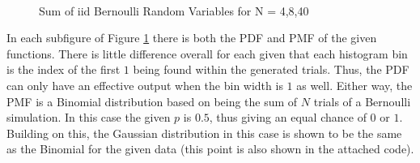 \documentclass[a4paper, 11pt]{article}
\begin{document}
\pagebreak
\begin{figure}
    \centering
     \\
\caption{\label{fig:BernSubFig}Sum of iid Bernoulli Random Variables for N = 4,8,40}
\end{figure}


\medskip
\noindent
In each subfigure of Figure \ref{fig:BernSubFig} there is both the PDF and PMF of the given functions. There is little difference overall for each given that each histogram bin is the index of the first \(1\) being found within the generated trials. Thus, the PDF can only have an effective output when the bin width is \(1\) as well.
Either way, the PMF is a Binomial distribution based on being the sum of \(N\) trials of a Bernoulli simulation. In this case the given \(p\) is \(0.5\), thus giving an equal chance of \(0\) or \(1\).
Building on this, the Gaussian distribution in this case is shown to be the same as the Binomial for the given data (this point is also shown in the attached code).
\end{document}
